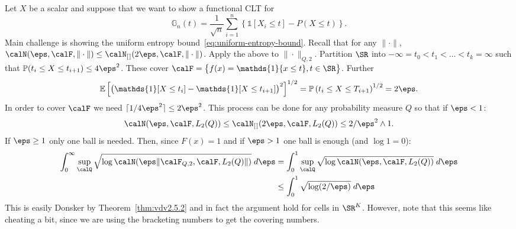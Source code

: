 \begin{example}
	\label{ex:cells-donsker}
	Let \(X\) be a scalar and suppose that we want to show a functional CLT for
	 \[
		 \mathbb{G}_n(t) = \frac{1}{\sqrt n}\sum_{i=1}^n \left\{\mathds{1}[X_i\leq t]-P(X\leq t)\right\} 
	.\]
	Main challenge is showing the uniform entropy bound~\eqref{eq:uniform-entropy-bound}. Recall that for any \(\|\cdot\|\), \(\calN(\eps,\calF,\|\cdot\|)\leq \calN_{[\hspace{0.1em}]}(2\eps,\calF,\|\cdot\|)\). Apply the above to \(\|\cdot\|_{Q,2}\). Partition \(\SR\) into  \(-\infty=t_0<t_1<\dots<t_k= \infty\) such that \(\P(t_i\leq X\leq t_{i+1}) \leq 4\eps^2\). These cover \(\calF= \left\{f(x)=\mathds{1}\{x\leq t\}, t\in\SR \right\}\). Further
	\[
		\E\left[\left(\mathds{1}[X\leq t_i]-\mathds{1}[X\leq t_{i+1}]\right)^2\right]^{1/2} = \P\left(t_i\leq X\leq T_{i+1}\right)^{1/2} = 2\eps
	.\]
	In order to cover \(\calF\) we need  \(\lceil 1/4\eps^2\rceil \leq 2\eps^2\). This process can be done for any probability measure \(Q\) so that if \(\eps < 1\):
	 \[
		 \calN(\eps,\calF,L_2(Q)) \leq  \calN_{[\hspace{0.1em}]}(2\eps,\calF,L_2(Q)) \leq 2/\eps^2  \wedge 1
	.\]
	If \(\eps \geq 1\) only one ball is needed. Then, since \(F(x)=1\) and if  \(\eps>1\) one ball is enough (and \(\log 1 =0\)):
	\begin{align*}
		\int_{0}^{\infty} \sup_{\calQ} \sqrt{\log\calN(\eps\|\calF_{Q,2},\calF,L_2(Q)\|)}\;d\eps &= \int_{0}^{1} \sup_{\calQ}\sqrt{\log\calN(\eps,\calF,L_2(Q))}\;d\eps \\
											 &\leq \int_{0}^{1} \sqrt{\log (2/\eps)}\;d\eps 
	\end{align*}
	This is easily Donsker by Theorem~\ref{thm:vdv2.5.2} and in fact the argument hold for cells in \(\SR^K\). However, note that this seems like cheating a bit, since we are using the bracketing numbers to get the covering numbers.
\end{example}

